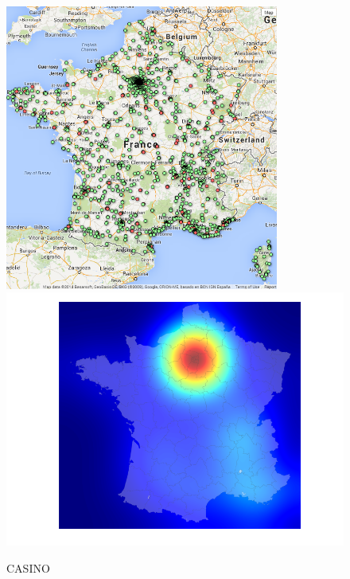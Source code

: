\documentclass[11pt]{article}
\begin{document}
\begin{figure}[H]
    \caption{CASINO}
	\centering
		\includegraphics[width=9cm]{images/maps_group_dots/CASINO.png}
        \includegraphics[width=12.8cm]{images/maps_group_heatmaps/CASINO.png}
\end{figure}
\end{document}
